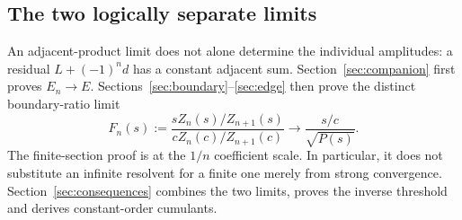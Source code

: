 \subsection{The two logically separate limits}
An adjacent-product limit does not alone determine the individual
amplitudes: a residual $L+(-1)^n d$ has a constant adjacent sum.
Section~\ref{sec:companion} first proves $E_n\to E$.
Sections~\ref{sec:boundary}--\ref{sec:edge} then prove the distinct
boundary-ratio limit
\begin{equation}\label{Ftarget}
 F_n(s):=\frac{sZ_n(s)/Z_{n+1}(s)}{cZ_n(c)/Z_{n+1}(c)}
 \longrightarrow \frac{s/c}{\sqrt{P(s)}}.
\end{equation}
The finite-section proof is at the $1/n$ coefficient scale. In
particular, it does not substitute an infinite resolvent for a finite
one merely from strong convergence. Section~\ref{sec:consequences}
combines the two limits, proves the inverse threshold and derives
constant-order cumulants.
